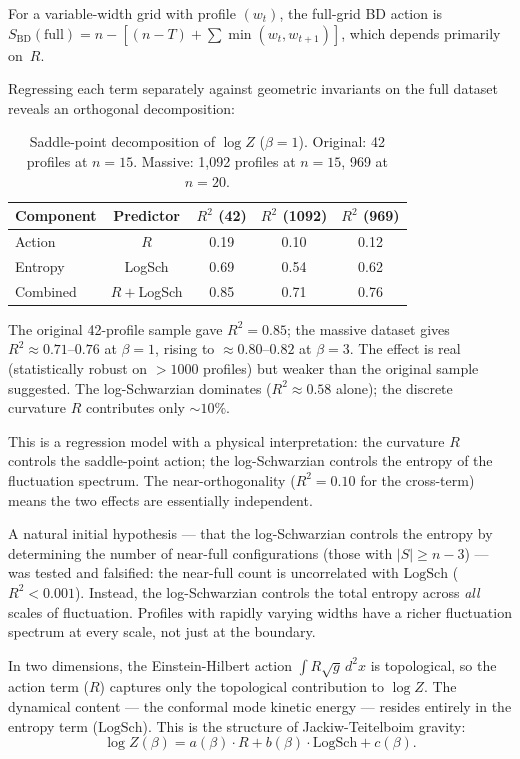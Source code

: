 \documentclass[aps,prd,twocolumn,superscriptaddress]{revtex4-2}
\begin{document}
For a variable-width grid with profile $(w_t)$, the full-grid BD
action is $S_{\mathrm{BD}}(\text{full}) = n - [(n-T) + \sum
\min(w_t, w_{t+1})]$, which depends primarily on~$R$.

Regressing each term separately against geometric invariants on the
full dataset reveals an orthogonal decomposition:

\begin{table}[h]
\caption{Saddle-point decomposition of $\log Z$ ($\beta = 1$).
Original: 42 profiles at $n = 15$. Massive: 1{,}092 profiles at
$n = 15$, 969 at $n = 20$.}
\label{tab:decomp}
\begin{ruledtabular}
\begin{tabular}{lcccc}
Component & Predictor & $R^2$ (42) & $R^2$ (1092) & $R^2$ (969) \\
\midrule
Action & $R$ & 0.19 & 0.10 & 0.12 \\
Entropy & LogSch & 0.69 & 0.54 & 0.62 \\
\midrule
Combined & $R{+}$LogSch & 0.85 & 0.71 & 0.76 \\
\end{tabular}
\end{ruledtabular}
\end{table}

The original 42-profile sample gave $R^2 = 0.85$; the massive
dataset gives $R^2 \approx 0.71$--$0.76$ at $\beta = 1$, rising to
$\approx 0.80$--$0.82$ at $\beta = 3$. The effect is real
(statistically robust on $> 1000$ profiles) but weaker than the
original sample suggested. The log-Schwarzian dominates
($R^2 \approx 0.58$ alone); the discrete curvature $R$ contributes
only $\sim 10\%$.

This is a regression model with a physical interpretation: the curvature $R$ controls the
saddle-point action; the log-Schwarzian controls the entropy of the
fluctuation spectrum. The near-orthogonality ($R^2 = 0.10$ for the
cross-term) means the two effects are essentially independent.

A natural initial hypothesis --- that the log-Schwarzian controls the
entropy by determining the number of near-full configurations
(those with $|S| \geq n - 3$) --- was tested and falsified: the
near-full count is uncorrelated with $\mathrm{LogSch}$
($R^2 < 0.001$). Instead, the log-Schwarzian controls the total
entropy across \emph{all} scales of fluctuation. Profiles with
rapidly varying widths have a richer fluctuation spectrum at every
scale, not just at the boundary.

In two dimensions, the Einstein-Hilbert action
$\int R \sqrt{g}\, d^2x$ is topological, so the action term ($R$)
captures only the topological contribution to $\log Z$. The dynamical
content --- the conformal mode kinetic energy --- resides entirely
in the entropy term ($\mathrm{LogSch}$). This is the structure
of Jackiw-Teitelboim gravity:
\begin{equation}
\label{eq:fit}
\log Z(\beta) = a(\beta) \cdot R + b(\beta) \cdot \mathrm{LogSch} + c(\beta).
\end{equation}
\end{document}
